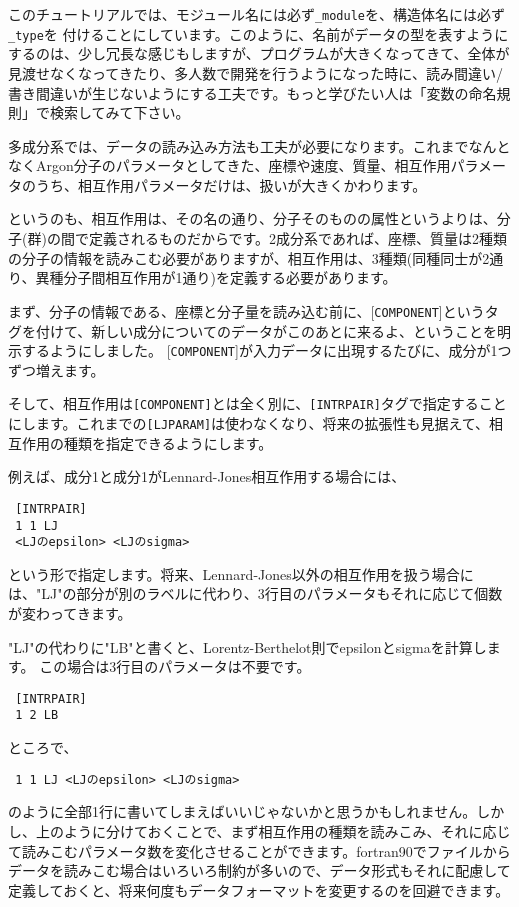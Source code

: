 \documentclass[a4,10pt]{article}
\begin{document}
\begin{shadebox}
    このチュートリアルでは、モジュール名には必ず{\tt \_module}を、構造体名には必ず{\tt \_type}を    付けることにしています。このように、名前がデータの型を表すようにするのは、少し冗長な感じもしますが、プログラムが大きくなってきて、全体が見渡せなくなってきたり、多人数で開発を行うようになった時に、読み間違い/書き間違いが生じないようにする工夫です。もっと学びたい人は「変数の命名規則」で検索してみて下さい。
\end{shadebox}
多成分系では、データの読み込み方法も工夫が必要になります。これまでなんとなくArgon分子のパラメータとしてきた、座標や速度、質量、相互作用パラメータのうち、相互作用パラメータだけは、扱いが大きくかわります。

というのも、相互作用は、その名の通り、分子そのものの属性というよりは、分子(群)の間で定義されるものだからです。2成分系であれば、座標、質量は2種類の分子の情報を読みこむ必要がありますが、相互作用は、3種類(同種同士が2通り、異種分子間相互作用が1通り)を定義する必要があります。

まず、分子の情報である、座標と分子量を読み込む前に、[{\tt COMPONENT}]というタグを付けて、新しい成分についてのデータがこのあとに来るよ、ということを明示するようにしました。
[{\tt COMPONENT}]が入力データに出現するたびに、成分が1つずつ増えます。

そして、相互作用は{\tt [COMPONENT]}とは全く別に、{\tt [INTRPAIR]}タグで指定することにします。これまでの{\tt [LJPARAM]}は使わなくなり、将来の拡張性も見据えて、相互作用の種類を指定できるようにします。

例えば、成分1と成分1がLennard-Jones相互作用する場合には、
\begin{screen}\begin{verbatim}
 [INTRPAIR]
 1 1 LJ
 <LJのepsilon> <LJのsigma>
\end{verbatim}\end{screen}
という形で指定します。将来、Lennard-Jones以外の相互作用を扱う場合には、"LJ"の部分が別のラベルに代わり、3行目のパラメータもそれに応じて個数が変わってきます。

"LJ"の代わりに"LB"と書くと、Lorentz-Berthelot則でepsilonとsigmaを計算します。
この場合は3行目のパラメータは不要です。
\begin{screen}\begin{verbatim}
 [INTRPAIR]
 1 2 LB
\end{verbatim}\end{screen}

ところで、
\begin{screen}\begin{verbatim}
 1 1 LJ <LJのepsilon> <LJのsigma>
\end{verbatim}\end{screen}
のように全部1行に書いてしまえばいいじゃないかと思うかもしれません。しかし、上のように分けておくことで、まず相互作用の種類を読みこみ、それに応じて読みこむパラメータ数を変化させることができます。fortran90でファイルからデータを読みこむ場合はいろいろ制約が多いので、データ形式もそれに配慮して定義しておくと、将来何度もデータフォーマットを変更するのを回避できます。
\end{document}
